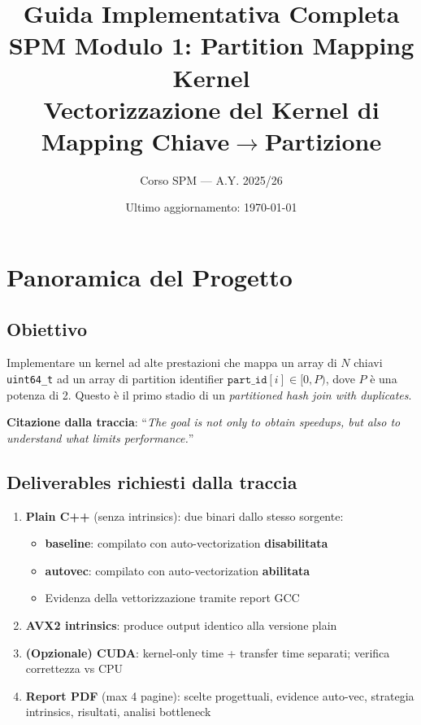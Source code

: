 \documentclass[11pt,a4paper]{article}
\title{\textbf{Guida Implementativa Completa\\SPM Modulo 1: Partition Mapping Kernel}\\[0.5em]
\large Vectorizzazione del Kernel di Mapping Chiave$\to$Partizione}
\author{Corso SPM --- A.Y. 2025/26}
\date{Ultimo aggiornamento: \today}
\begin{document}
\maketitle
\tableofcontents
\newpage

\section{Panoramica del Progetto}

\subsection{Obiettivo}
Implementare un kernel ad alte prestazioni che mappa un array di $N$ chiavi \texttt{uint64\_t} ad un array di partition identifier $\texttt{part\_id}[i] \in [0, P)$, dove $P$ è una potenza di 2. Questo è il primo stadio di un \textit{partitioned hash join with duplicates}.

\textbf{Citazione dalla traccia}: ``\textit{The goal is not only to obtain speedups, but also to understand what limits performance.}''

\subsection{Deliverables richiesti dalla traccia}
\begin{enumerate}
    \item \textbf{Plain C++} (senza intrinsics): due binari dallo stesso sorgente:
    \begin{itemize}
        \item \textbf{baseline}: compilato con auto-vectorization \textbf{disabilitata}
        \item \textbf{autovec}: compilato con auto-vectorization \textbf{abilitata}
        \item Evidenza della vettorizzazione tramite report GCC
    \end{itemize}
    \item \textbf{AVX2 intrinsics}: produce output identico alla versione plain
    \item \textbf{(Opzionale) CUDA}: kernel-only time + transfer time separati; verifica correttezza vs CPU
    \item \textbf{Report PDF} (max 4 pagine): scelte progettuali, evidence auto-vec, strategia intrinsics, risultati, analisi bottleneck
\end{enumerate}
\end{document}
